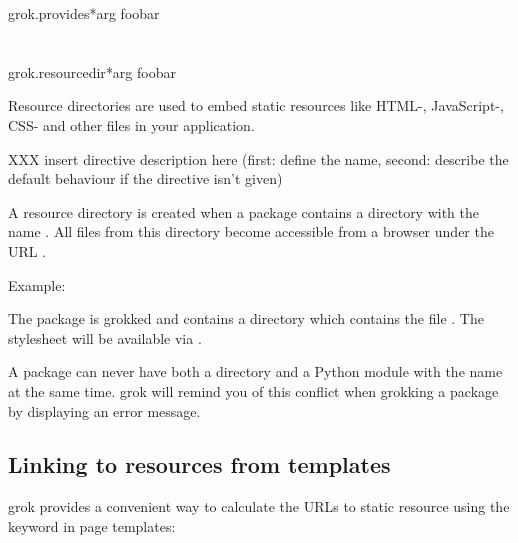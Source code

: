         \begin{funcdesc}{grok.provides}{*arg}
        foobar
        \end{funcdesc}

    \section{}

        \begin{funcdesc}{grok.resourcedir}{*arg}
        foobar
        \end{funcdesc}

        Resource directories are used to embed static resources like HTML-,
        JavaScript-, CSS- and other files in your application.

        XXX insert directive description here (first: define the name, second:
        describe the default behaviour if the directive isn't given)

        A resource directory is created when a package contains a directory
        with the name . All files from this directory become
        accessible from a browser under the URL
        .

        \begin{bf}Example:\end{bf} The package  is grokked and
        contains a directory  which contains the file
        . The stylesheet will be available via
        .

        \begin{notice}
        A package can never have both a  directory and a Python
        module with the name  at the same time. grok will
        remind you of this conflict when grokking a package by displaying an
        error message.
        \end{notice}

        \subsection{Linking to resources from templates}

            grok provides a convenient way to calculate the URLs to static
            resource using the keyword  in page templates:

